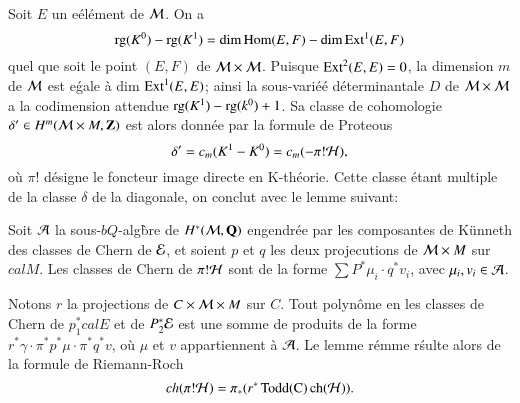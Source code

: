 Soit $E$ un e\'el\'ement de $\mathcal{M}$. On a
$$
\operatorname{rg}(K^{0})-\operatorname{rg}(K^{1}) = \dim \operatorname{Hom}(E,F)-\dim \operatorname{Ext}^{1}(E, F)
$$
quel que soit le point $(E, F)$ de $\mathcal{M} \times \mathcal{M}$. Puisque $\operatorname{Ext}^{2}(E, E) = 0$, la dimension $m$ de $\mathcal{M}$ est e\'gale \`a dim $\operatorname{Ext}^{1}(E, E)$; ainsi la sous-vari\'e\'e d\'eterminantale $D$ de $\mathcal{M} \times \mathcal{M}$ a la codimension attendue $\operatorname{rg}(K^{1}) - \operatorname{rg}(k^{0}) + 1$. Sa classe de cohomologie $\delta' \in H^{m}(\mathcal{M} \times M, \mathbf{Z})$ est alors donn\'ee par la formule de Proteous  
$$
\delta' = c_{m}(K^{1}-K^{0}) = c_{m}(-\pi!\mathcal{H}),
$$
o\`u $\pi!$ d\'esigne le foncteur image directe en K-th\'eorie. Cette classe \'etant multiple de la classe $\delta$ de la diagonale, on conclut avec le lemme suivant:

\begin{lemme*}
Soit $\mathcal{A}$ la sous-$bQ$-alg\`bre de  $H^{*}(\mathcal{M}, \mathbf{Q})$ engendr\'ee par les composantes de K\"unneth des classes de Chern de $\mathcal{E}$, et soient $p$ et $q$ les deux projecutions de $\mathcal{M} \times M$ sur $calM$. Les classes de Chern de $\pi!\mathcal{H}$ sont de la forme $\sum P^{*}\mu_{i} \cdot q^{*}v_{i}$, avec $\mu_{i}, v_{i}\in \mathcal{A}$. 
\end{lemme*}

Notons $r$ la projections de $C\times \mathcal{M} \times M$ sur $C$. Tout polyn\^ome
en les classes de Chern de $p_{1}^{*}calE$ et de $P_{2}^{*}\mathcal{E}$ est une somme de produits de la forme $r^{*}\gamma\cdot \pi^{*}p^{*}\mu \cdot \pi^{*}q^{*}v$,  o\`u $\mu$ et $v$ appartiennent \`a $\mathcal{A}$. Le lemme r\'emme r\'sulte alors de la formule de Riemann-Roch
$$
ch(\pi!\mathcal{H}) =\pi_{*}(r^{*}\operatorname{Todd}(\operatorname{C}) \operatorname{ch}(\mathcal{H})). 
$$

